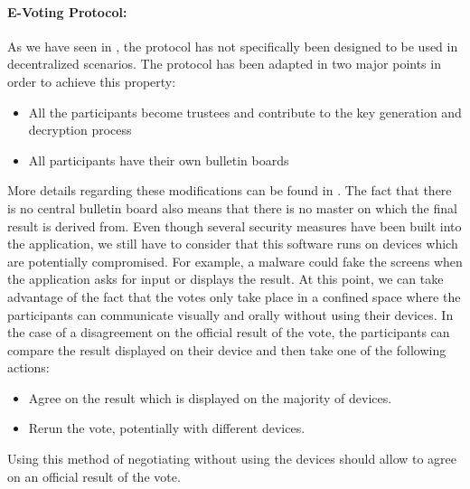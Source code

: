 \documentclass[numbers=noenddot, abstract=on, a4paper, headsepline,
footsepline, oneside, openright, draft=off, listof=leveldown]{scrreprt}
\begin{document}
\paragraph{E-Voting Protocol:} As we have seen in , the protocol
has not specifically been designed to be used in decentralized scenarios. The
protocol has been adapted in two major points in order to achieve this property:
\begin{itemize}
  \item All the participants become trustees and contribute to the key
  generation and decryption process
  \item All participants have their own bulletin boards
\end{itemize}
More details regarding these modifications can be found in
. The fact that there is no central bulletin board also
means that there is no master on which the final result is derived from. Even
though several security measures have been built into the application, we still have to
consider that this software runs on devices which are potentially compromised.
For example, a malware could fake the screens when the application asks for
input or displays the result.
At this point, we can take advantage of the fact that the votes only take place
in a confined space where the participants can communicate visually and orally
without using their devices. In the case of a disagreement on the official
result of the vote, the participants can compare the result displayed on their
device and then take one of the following actions:
\begin{itemize}
  \item Agree on the result which is displayed on the majority of devices.
  \item Rerun the vote, potentially with different devices.
\end{itemize}
Using this method of negotiating without using the devices should allow to agree
on an official result of the vote.
\end{document}
